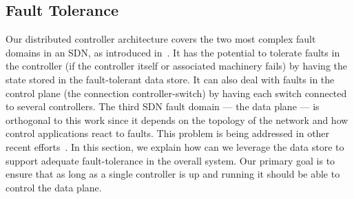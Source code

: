 \subsection{Fault Tolerance}
\label{sec:heimdall:fault-tolerance}
Our distributed controller architecture covers the two most complex fault domains in an SDN, as introduced in~\cite{kim2012}.
It has the potential to tolerate faults in the controller (if the controller itself or associated machinery fails) by having the state stored in the fault-tolerant data store.
It can also deal with faults in the control plane (the connection controller-switch) by having each switch connected to several controllers. 
The third SDN fault domain --- the data plane --- is orthogonal to this work since it depends on the topology of the network and how control applications react to faults.
This problem is being addressed in other recent efforts~\cite{kim2012,Reitblatt2013}. 
In this section, we explain how can we leverage the data store to support adequate fault-tolerance in the overall system. 
Our primary goal is to ensure that as long as a single controller is up and running it should be able to control the data plane. 


